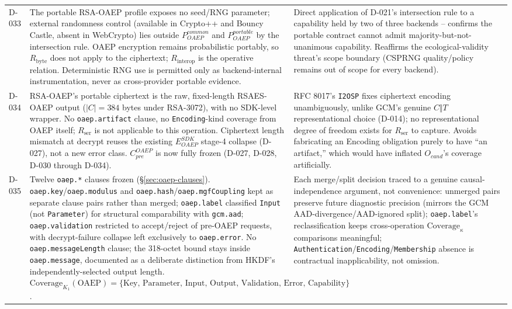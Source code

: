 \documentclass[11pt,a4paper]{article}
\begin{document}
\begin{longtable}{@{}L{0.28\textwidth}L{0.34\textwidth}L{0.30\textwidth}@{}}
D-033 & The portable RSA-OAEP profile exposes no seed/RNG parameter; external randomness control (available in Crypto++ and Bouncy Castle, absent in WebCrypto) lies outside $P_{OAEP}^{common}$ and $P_{OAEP}^{portable}$ by the intersection rule. OAEP encryption remains probabilistic portably, so $R_{\text{byte}}$ does not apply to the ciphertext; $R_{\text{interop}}$ is the operative relation. Deterministic RNG use is permitted only as backend-internal instrumentation, never as cross-provider portable evidence. & Direct application of D-021's intersection rule to a capability held by two of three backends -- confirms the portable contract cannot admit majority-but-not-unanimous capability. Reaffirms the ecological-validity threat's scope boundary (CSPRNG quality/policy remains out of scope for every backend).\\
D-034 & RSA-OAEP's portable ciphertext is the raw, fixed-length RSAES-OAEP output ($|C|=384$ bytes under RSA-3072), with no SDK-level wrapper. No \texttt{oaep.artifact} clause, no \texttt{Encoding}-kind coverage from OAEP itself; $R_{\text{ser}}$ is not applicable to this operation. Ciphertext length mismatch at decrypt reuses the existing $E_{OAEP}^{SDK}$ stage-4 collapse (D-027), not a new error class. $C_{pre}^{OAEP}$ is now fully frozen (D-027, D-028, D-030 through D-034). & RFC 8017's \texttt{I2OSP} fixes ciphertext encoding unambiguously, unlike GCM's genuine $C\Vert T$ representational choice (D-014); no representational degree of freedom exists for $R_{\text{ser}}$ to capture. Avoids fabricating an Encoding obligation purely to have ``an artifact,'' which would have inflated $O_{cand}$'s coverage artificially.\\
D-035 & Twelve \texttt{oaep.*} clauses frozen (\S\ref{sec:oaep-clauses}). \texttt{oaep.key}/\texttt{oaep.modulus} and \texttt{oaep.hash}/\texttt{oaep.mgfCoupling} kept as separate clause pairs rather than merged; \texttt{oaep.label} classified \texttt{Input} (not \texttt{Parameter}) for structural comparability with \texttt{gcm.aad}; \texttt{oaep.validation} restricted to accept/reject of pre-OAEP requests, with decrypt-failure collapse left exclusively to \texttt{oaep.error}. No \texttt{oaep.messageLength} clause; the 318-octet bound stays inside \texttt{oaep.message}, documented as a deliberate distinction from HKDF's independently-selected output length. $\text{Coverage}_{K_1}(\text{OAEP}) = \{\text{Key, Parameter, Input, Output, Validation, Error, Capability}\}$. & Each merge/split decision traced to a genuine causal-independence argument, not convenience: unmerged pairs preserve future diagnostic precision (mirrors the GCM AAD-divergence/AAD-ignored split); \texttt{oaep.label}'s reclassification keeps cross-operation $\text{Coverage}_\kappa$ comparisons meaningful; \texttt{Authentication}/\texttt{Encoding}/\texttt{Membership} absence is contractual inapplicability, not omission.\\

\end{longtable}
\end{document}
